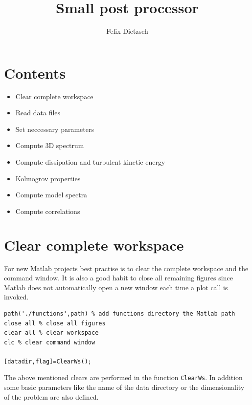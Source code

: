 \documentclass[preprint,12pt,ntfdMod]{elsarticle}
\author[rss]{Felix Dietzsch}
\title{Small post processor}
\begin{document}
\maketitle 
\tableofcontents

    
    
\section{Contents}

\begin{itemize}
\setlength{\itemsep}{-1ex}
   \item Clear complete workspace
   \item Read data files
   \item Set neccessary parameters
   \item Compute 3D spectrum
   \item Compute dissipation and turbulent kinetic energy
   \item Kolmogrov properties
   \item Compute model spectra
   \item Compute correlations
\end{itemize}


\section{Clear complete workspace}

\begin{par}
For new Matlab projects best practise is to clear the complete workspace and the command window. It is also a good habit to close all remaining figures since Matlab does not automatically open a new window each time a plot call is invoked.
\end{par} \vspace{1em}
\begin{lstlisting}
path('./functions',path) % add functions directory the Matlab path
close all % close all figures
clear all % clear workspace
clc % clear command window

[datadir,flag]=ClearWs();
\end{lstlisting}
\begin{par}

The above mentioned clears are performed in the function \verb|ClearWs|.
In addition some basic parameters like the name of the data
directory or the dimensionality of the problem are also defined.


\end{par} \vspace{1em}
\end{document}
